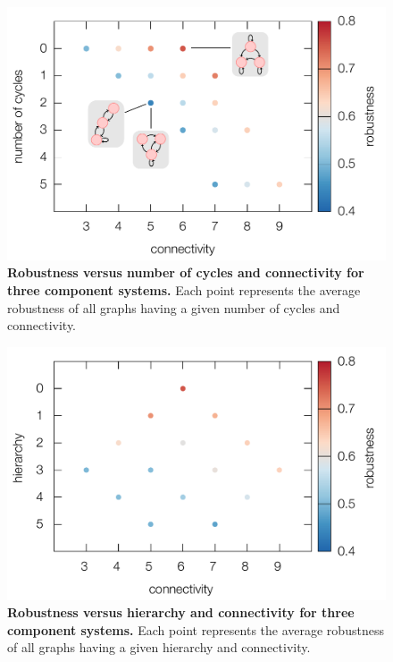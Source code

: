 \pagebreak

\begin{figure}[!ht]
\centering
\noindent\includegraphics[width=0.8\columnwidth]{fig/connectcycle3D3x3.pdf}
\caption{{\bf Robustness versus number of cycles and connectivity for three component systems.} Each point represents the average robustness of all graphs having a given number of cycles and connectivity.}
\label{fig:connectcycle3D3x3}
\end{figure}

\pagebreak

\begin{figure}[!ht]
\centering
\noindent\includegraphics[width=0.8\columnwidth]{fig/connectdist3D3x3.pdf}
\caption{{\bf Robustness versus hierarchy and connectivity for three component systems.} Each point represents the average robustness of all graphs having a given hierarchy and connectivity.}
\label{fig:connectdist3D3x3}
\end{figure}

\pagebreak


